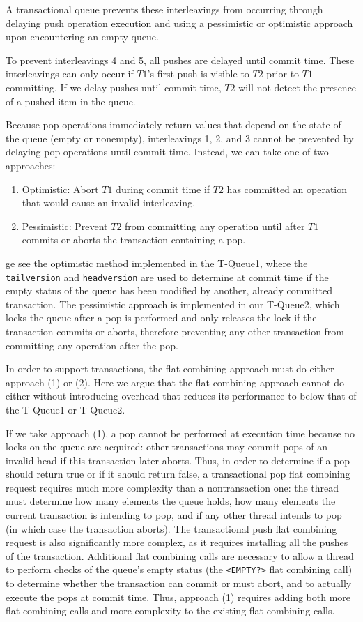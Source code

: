 A transactional queue prevents these interleavings from occurring through delaying push operation execution and using a pessimistic or optimistic approach upon encountering an empty queue.

To prevent interleavings 4 and 5, all pushes are delayed until commit time. These interleavings can only occur if $T1$'s first push is visible to $T2$ prior to $T1$ committing. If we delay pushes until commit time, $T2$ will not detect the presence of a pushed item in the queue.

Because pop operations immediately return values that depend on the state of the queue (empty or nonempty), interleavings 1, 2, and 3 cannot be prevented by delaying pop operations until commit time. Instead, we can take one of two approaches:
\begin{enumerate}
    \item Optimistic: Abort $T1$ during commit time if $T2$ has committed an operation that would cause an invalid interleaving.
    \item Pessimistic: Prevent $T2$ from committing any operation until after $T1$ commits or aborts the transaction containing a pop.
\end{enumerate}

ge see the optimistic method implemented in the T-Queue1, where the \texttt{tailversion} and \texttt{headversion} are used to determine at commit time if the empty status of the queue has been modified by another, already committed transaction. The pessimistic approach is implemented in our T-Queue2, which locks the queue after a pop is performed and only releases the lock if the transaction commits or aborts, therefore preventing any other transaction from committing any operation after the pop.

In order to support transactions, the flat combining approach must do either approach (1) or (2). Here we argue that the flat combining approach cannot do either without introducing overhead that reduces its performance to below that of the T-Queue1 or T-Queue2.

If we take approach (1), a pop cannot be performed at execution time because no locks on the queue are acquired: other transactions may commit pops of an invalid head if this transaction later aborts. Thus, in order to determine if a pop should return true or if it should return false, a transactional pop flat combining request requires much more complexity than a nontransaction one: the thread must determine how many elements the queue holds, how many elements the current transaction is intending to pop, and if any other thread intends to pop (in which case the transaction aborts). The transactional push flat combining request is also significantly more complex, as it requires installing all the pushes of the transaction. Additional flat combining calls are necessary to allow a thread to perform checks of the queue's empty status (the \texttt{<EMPTY?>} flat combining call) to determine whether the transaction can commit or must abort, and to actually execute the pops at commit time. Thus, approach (1) requires adding both more flat combining calls and more complexity to the existing flat combining calls.

